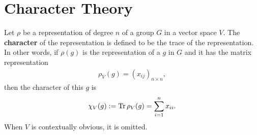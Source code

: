 \clearpage{\thispagestyle{empty}}
\section{Character Theory}

%	
%	
	
	\begin{definition}\label{def:character}
		Let $\rho$ be a representation of degree $n$ of a group $G$ in a vector space $V$. The \textbf{character} of the representation is defined to be the trace of the representation. In other words, if $\rho(g)$ is the representation of a $g$ in $G$ and it has the matrix representation
		\begin{align}
			\rho_V(g) = (x_{ij})_{n \times n},
		\end{align}
		then the character of this $g$ is
		\begin{align}
			\chi_V(g) := \Tr \rho_V(g) = \sum_{i=1}^{n} x_{ii}.\label{eq:deftrace}
		\end{align}
		When $V$ is contextually obvious, it is omitted.
	\end{definition}
	
